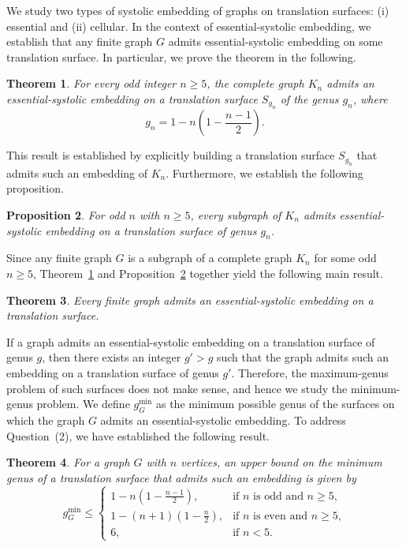 \documentclass[11pt]{amsart}
\theoremstyle{plain}
\newtheorem{theorem}{Theorem}[section]
\newtheorem{proposition}[theorem]{Proposition}
\theoremstyle{definition}
\theoremstyle{remark}
\numberwithin{equation}{section}
\numberwithin{figure}{section}
\begin{document}
We study two types of systolic embedding of graphs on translation surfaces: (i) essential and (ii) cellular. In the context of essential-systolic embedding, we establish that any finite graph $G$ admits essential-systolic embedding on some translation surface. In particular, we prove the theorem in the following.

\begin{theorem}\label{main theorem 1}
For every odd integer $n\geq 5$, the complete graph $K_n$ admits an essential-systolic embedding on a translation surface $S_{g_n}$ of the genus $g_n$, where $$g_n = 1 - n \left( 1 - \frac{n-1}{2} \right).$$
\end{theorem}

This result is established by explicitly building a translation surface \( S_{g_n} \) that admits such an embedding of \( K_n \). Furthermore, we establish the following proposition.

\begin{proposition}\label{proposition 1}
For odd $n$ with $n\geq 5$, every subgraph of $K_n$ admits essential-systolic embedding on a translation surface of genus $g_n$.

\end{proposition}

Since any finite graph \( G \) is a subgraph of a complete graph $K_n$ for some odd $n\ge5$, Theorem~\ref{main theorem 1} and Proposition~\ref{proposition 1} together yield the following main result.

\begin{theorem} \label{Main Result}
Every finite graph admits an essential-systolic embedding on a translation surface. 
\end{theorem}

If a graph admits an essential-systolic embedding on a translation surface of genus $g$, then there exists an integer $g'>g$ such that the graph admits such an embedding on a translation surface of genus $g'$. Therefore, the maximum-genus problem of such surfaces does not make sense, and hence we study the minimum-genus problem. We define $g^{\min}_G$ as the minimum possible genus of the surfaces on which the graph $G$ admits an essential-systolic embedding. To address Question~(2), we have established the following result.

\begin{theorem} \label{upper bound}
For a graph \( G \) with \( n \) vertices, an upper bound on the minimum genus of a translation surface that admits such an embedding is given by
\[
g^{\min}_G \leq 
\begin{cases}
1 - n\left(1 - \frac{n - 1}{2}\right), & \text{if } n \text{ is odd and } n \geq 5, \\[0.5em]
1 - (n + 1)\left(1 - \frac{n}{2}\right), & \text{if } n \text{ is even and } n \geq 5, \\[0.5em]
6, & \text{if } n < 5.
\end{cases}
\]
\end{theorem}
\end{document}
